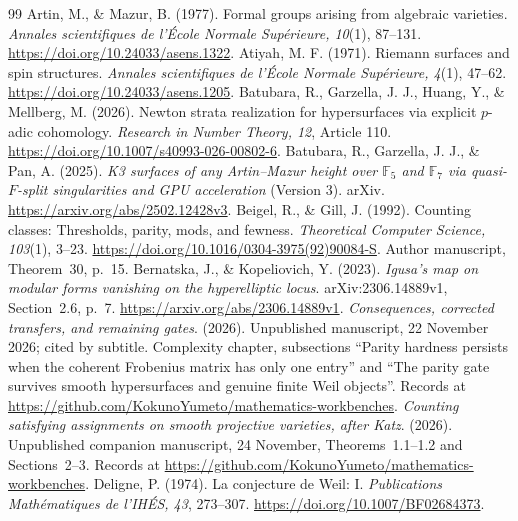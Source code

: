 \documentclass[11pt]{article}
\newcommand{\recordurl}{https://github.com/KokunoYumeto/mathematics-workbenches}
\theoremstyle{definition}
\begin{document}
\setlength{\bibsep}{3pt}
\begin{thebibliography}{99}
 Artin, M., \& Mazur, B. (1977). Formal groups arising from algebraic varieties. \emph{Annales scientifiques de l'\'Ecole Normale Sup\'erieure, 10}(1), 87--131. \url{https://doi.org/10.24033/asens.1322}.
 Atiyah, M. F. (1971). Riemann surfaces and spin structures. \emph{Annales scientifiques de l'\'Ecole Normale Sup\'erieure, 4}(1), 47--62. \url{https://doi.org/10.24033/asens.1205}.
 Batubara, R., Garzella, J. J., Huang, Y., \& Mellberg, M. (2026). Newton strata realization for hypersurfaces via explicit $p$-adic cohomology. \emph{Research in Number Theory, 12}, Article 110. \url{https://doi.org/10.1007/s40993-026-00802-6}.
 Batubara, R., Garzella, J. J., \& Pan, A. (2025). \emph{K3 surfaces of any Artin--Mazur height over $\mathbb F_5$ and $\mathbb F_7$ via quasi-$F$-split singularities and GPU acceleration} (Version 3). arXiv. \url{https://arxiv.org/abs/2502.12428v3}.
 Beigel, R., \& Gill, J. (1992). Counting classes: Thresholds, parity, mods, and fewness. \emph{Theoretical Computer Science, 103}(1), 3--23. \url{https://doi.org/10.1016/0304-3975(92)90084-S}. Author manuscript, Theorem~30, p.~15.
 Bernatska, J., \& Kopeliovich, Y. (2023). \emph{Igusa's map on modular forms vanishing on the hyperelliptic locus}. arXiv:2306.14889v1, Section~2.6, p.~7. \url{https://arxiv.org/abs/2306.14889v1}.
 \emph{Consequences, corrected transfers, and remaining gates}. (2026). Unpublished manuscript, 22 November 2026; cited by subtitle. Complexity chapter, subsections ``Parity hardness persists when the coherent Frobenius matrix has only one entry'' and ``The parity gate survives smooth hypersurfaces and genuine finite Weil objects''. Records at \url{\recordurl}.
 \emph{Counting satisfying assignments on smooth projective varieties, after Katz}. (2026). Unpublished companion manuscript, 24 November, Theorems~1.1--1.2 and Sections~2--3. Records at \url{\recordurl}.
 Deligne, P. (1974). La conjecture de Weil: I. \emph{Publications Math\'ematiques de l'IH\'ES, 43}, 273--307. \url{https://doi.org/10.1007/BF02684373}.

\end{thebibliography}
\end{document}
